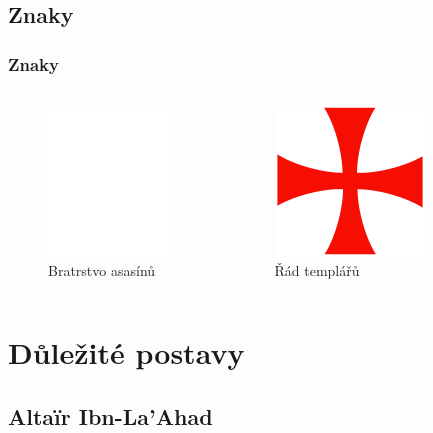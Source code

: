 \documentclass[hyperref={colorlinks, linkcolor=white, urlcolor=green!50!black}]{beamer}
\begin{document}
\subsection{Znaky}

\begin{frame}
\frametitle{Znaky}
\begin{columns}[c]
	
	\begin{figure}[ht]
		\includegraphics[height=150px]{logo_assassins}
		\captionsetup{labelformat=empty}		
		\caption{Bratrstvo asasínů}
	\end{figure}
	
	\begin{figure}[ht]
		\includegraphics[height=150px]{logo_templars}
		\captionsetup{labelformat=empty}
		\caption{Řád templářů}
	\end{figure}
	
\end{columns}
\end{frame}

\section{Důležité postavy}

\subsection[Altair]{Altaïr Ibn-La'Ahad}
\end{document}
